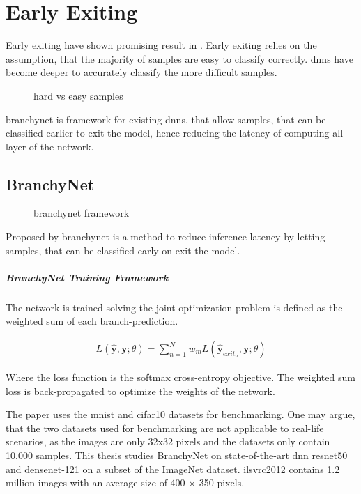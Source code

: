 \chapter{Early Exiting}

Early exiting have shown promising result in \cite{teerapittayanon_branchynet:_2016, teerapittayanon_distributed_2017, huang_multi-scale_2017}. Early exiting relies on the assumption, that the majority of samples are easy to classify correctly. \gls{dnn}s have become deeper to accurately classify the more difficult samples.

\begin{figure}
	hard vs easy samples
\end{figure}

\gls{branchynet} \cite{teerapittayanon_branchynet:_2016} is framework  for existing \gls{dnn}s, that allow samples, that can be classified earlier to exit the model, hence reducing the latency of computing all layer of the network.

\section{BranchyNet}

\begin{figure}
	branchynet framework
\end{figure}

Proposed by \citeauthor{teerapittayanon_branchynet:_2016} \gls{branchynet} \cite{teerapittayanon_branchynet:_2016} is a method to reduce inference latency by letting samples, that can be classified early on exit the model.

\paragraph{BranchyNet Training Framework}

The network is trained solving the joint-optimization problem is defined as the weighted sum of each branch-prediction.

\begin{align*}
L(\hat{\mathbf{y}},\mathbf{y};\theta) = \sum_{n=1}^{N} w_m L(\hat{\mathbf{y}}_{exit_n},\mathbf{y};\theta)
\end{align*}

Where the loss function is the softmax cross-entropy objective.
The weighted sum loss is back-propagated to optimize the weights of the network. 

The paper uses the \gls{mnist} and \gls{cifar10} datasets for benchmarking. One may argue, that the two datasets used for benchmarking are not applicable to real-life scenarios, as the images are only 32x32 pixels and the datasets only contain 10.000 samples. This thesis studies BranchyNet on state-of-the-art \gls{dnn} \gls{resnet}50 and \gls{densenet}-121 on a subset of the ImageNet dataset. \gls{ilsvrc2012} contains 1.2 million images with an average size of 400 $\times$ 350 pixels.

